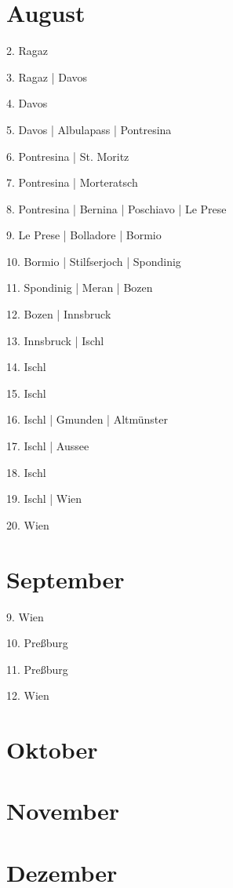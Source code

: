 \documentclass[twoside=false,titlepage=false,open=any, parskip=never, fontsize=10pt, headings=small, chapterprefix=false, appendixprefix=false, DIV=15]{scrbook}
\begin{document}
\begin{multicols}{3}
            \section*{August}
            2. Ragaz\par
            3. Ragaz | Davos\par
            4. Davos\par
            5. Davos | Albulapass | Pontresina\par
            6. Pontresina | St. Moritz\par
            7. Pontresina | Morteratsch\par
            8. Pontresina | Bernina | Poschiavo | Le Prese\par
            9. Le Prese | Bolladore | Bormio\par
            10. Bormio | Stilfserjoch | Spondinig\par
            11. Spondinig | Meran | Bozen\par
            12. Bozen | Innsbruck\par
            13. Innsbruck | Ischl\par
            14. Ischl\par
            15. Ischl\par
            16. Ischl | Gmunden | Altmünster\par
            17. Ischl | Aussee\par
            18. Ischl\par
            19. Ischl | Wien\par
            20. Wien\par
            \section*{September}
            9. Wien\par
            10. Preßburg\par
            11. Preßburg\par
            12. Wien\par
            \section*{Oktober}
            \section*{November}
            \section*{Dezember}

\end{multicols}
\end{document}
